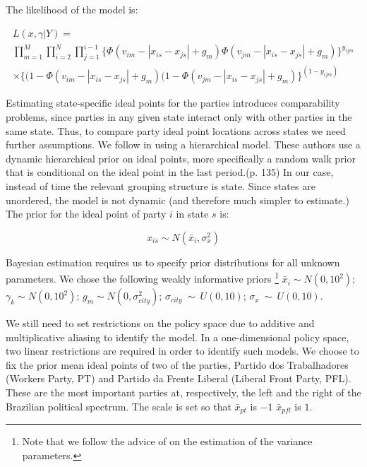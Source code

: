 The likelihood of the model is: 

\begin{eqnarray}
  \label{eq:llike}
  L(x,\gamma|Y)=\\
\prod^M_{m=1}\prod^N_{i=2}\prod^{i-1}_{j=1}  \{\Phi( v_{im}-|x_{is}-x_{js}|+g_{m})\Phi( v_{jm}-|x_{is}-x_{js}|+g_{m})\}^{y_{ijm}}\\
  \times\{(1-\Phi( v_{im}-|x_{is}-x_{js}|+g_{m})(1-\Phi( v_{jm}-|x_{is}-x_{js}|+g_{m})\}^{(1-y_{ijm})}
\end{eqnarray}

Estimating state-specific ideal points for the parties introduces  comparability problems, since  parties in any given state interact only with other parties in the same state. Thus, to compare party ideal point locations across states we need further assumptions. We follow \citet{martin:2002} in using a  hierarchical model. These authors use a  dynamic hierarchical prior  on  ideal points, more specifically  a random walk prior that is conditional on the ideal point in the last period.(p. 135) In our case, instead of time the relevant grouping structure is state. Since states are unordered,  the model is not dynamic (and therefore much simpler to estimate.) The prior for the  ideal point of party $i$ in state $s$ is:


\begin{equation}
  \label{eq:5}
  x_{is} \sim N(\bar x_{i},\sigma_x^2)
\end{equation}

Bayesian estimation requires us to specify prior distributions for all unknown parameters. We chose the following weakly informative priors \citep{gelman:2008} \footnote{Note that we follow the advice of \citet{gelman:2004} on the estimation of the variance parameters.} $\bar x_i \sim N(0,10^2)$; $\gamma_k\sim N(0,10^2)$;   $g_m\sim N(0,\sigma_{city}^2)$;  $\sigma_{city}~\sim~U(0,10)$;   $\sigma_x~\sim~U(0,10)$.

We still need to set restrictions on the policy space due to additive and multiplicative aliasing to identify the model.\citep{bafumi:2005}  In a one-dimensional policy space, two linear restrictions are required in order to identify such models.\citep{rivers:2004} We choose to fix the prior mean ideal points of two of the parties, Partido dos Trabalhadores (Workers Party, PT) and Partido da Frente Liberal (Liberal Front Party, PFL).  These  are  the most important parties at, respectively, the left and the right of the Brazilian political spectrum.\citep{figueiredo:1995}   The  scale is set so that  $\bar x_{pt}$   is  $-1$  $\bar x_{pfl}$ is  $1$. 


